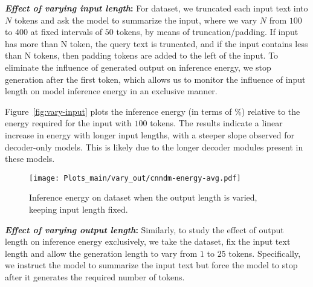 \noindent \textbf{\textit{Effect of varying input length}:}
For \cnndm dataset, we truncated each input text into $N$ tokens and ask the model to summarize the input, where we vary $N$ from $100$ to $400$ at fixed intervals of $50$ tokens, by means of truncation/padding. If input has more than N token,  
the query text is truncated, and if the input contains less than N tokens, then padding tokens are added to the left of the input.
%
To eliminate the influence of generated output on inference energy, we stop generation after the first token, which allows us to monitor the influence of input length on model inference energy in an exclusive manner.

Figure~\ref{fig:vary-input} plots the inference energy (in terms of \%) relative to the energy required for the input with $100$ tokens. The results indicate a linear increase in energy with longer input lengths, with a steeper slope observed for decoder-only models. This is likely due to the longer decoder modules present in these models.




\begin{figure}[!t]
\centering
\texttt{[image: Plots\_main/vary\_out/cnndm-energy-avg.pdf]}
\caption{Inference energy on \cnndm{} dataset when the output length is varied, keeping input length fixed. }
\label{fig:vary-output}
\end{figure}






\noindent \textbf{\textit{Effect of varying output length}:}
Similarly, to study the effect of output length on inference energy exclusively, we take the \cnndm dataset, fix the input text length and allow the generation length to vary from $1$ to $25$ tokens. Specifically, we instruct the model to summarize the input text 
but force the model to stop after it generates the required number of tokens. 

